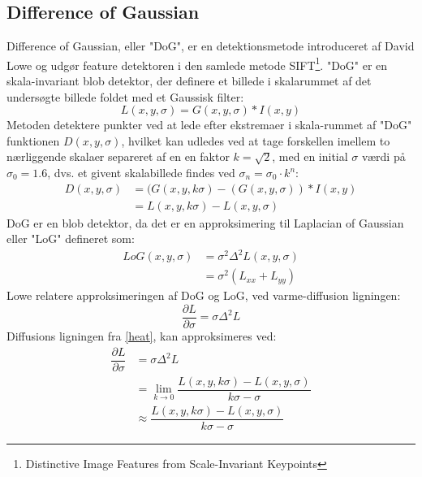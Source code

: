 \subsection{Difference of Gaussian}
Difference of Gaussian, eller "DoG", er en
detektionsmetode introduceret  af David Lowe \cite{SIFT} og udgør feature detektoren i den samlede metode SIFT\footnote{Distinctive Image Features
from Scale-Invariant Keypoints}. "DoG" er en skala-invariant blob detektor, der definere et billede i skalarummet af det undersøgte billede foldet med et Gaussisk filter:
\begin{equation}
L(x,y,\sigma)= G(x,y,\sigma) \ast I(x,y)
\end{equation}
Metoden detektere punkter ved at lede efter ekstremaer i skala-rummet af "DoG" funktionen $ D(x,y,\sigma) $, hvilket kan udledes ved at tage forskellen imellem to nærliggende skalaer separeret af en en faktor $k=\sqrt{2}$, med en initial $\sigma$ værdi på $\sigma_0 = 1.6$, dvs. et givent skalabillede findes ved $\sigma_n=\sigma_0 \cdot k^n$:
\begin{equation}
\begin{split}
D(x,y,\sigma) &= (G(x,y,k\sigma)-(G(x,y,\sigma))\ast I(x,y) \\
           &= L(x,y,k \sigma)-L(x,y,\sigma)
\end{split}
\end{equation}
DoG er en blob detektor, da det er en approksimering til Laplacian of Gaussian eller "LoG" defineret som:
\begin{equation}
\begin{split}
LoG(x,y,\sigma) &= \sigma^2 \Delta^2L(x,y,\sigma) \\
                &= \sigma^2 (L_{xx}+L_{yy})
\end{split}
\end{equation}
Lowe relatere approksimeringen af DoG og LoG, ved varme-diffusion ligningen:
\begin{equation}
\dfrac{\partial L}{\partial \sigma} = \sigma \Delta^2L
\label{heat}
\end{equation}
Diffusions ligningen fra \eqref{heat}, kan approksimeres ved:
\begin{equation}
\begin{split}
\dfrac{\partial L}{\partial \sigma} &= \sigma \Delta^2L \\
&= \lim_{k \to 0} \dfrac{L(x,y,k\sigma)-L(x,y,\sigma)}{k\sigma-\sigma} \\
&\approx \dfrac{L(x,y,k\sigma)-L(x,y,\sigma)}{k\sigma-\sigma}
\end{split}
\label{difference}
\end{equation}
